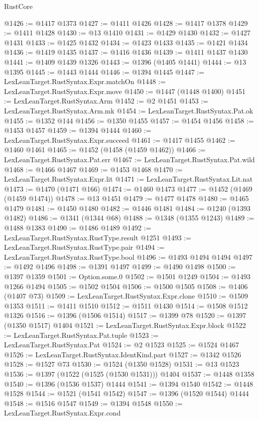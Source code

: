 \begin{lexlean}{RustCore}
\begin{coremodule}
{\begin{coremodule}
{{{{{{{{{{{{{{{{{{{{{{{{{{{{{{{{{{{{{{{{{{{{{@1426 := @1417 @1373
@1427 := @1411 @1426
@1428 := @1417 @1378
@1429 := @1411 @1428
@1430 := @13 @1410
@1431 := @1429 @1430
@1432 := @1427 @1431
@1433 := @1425 @1432
@1434 := @1423 @1433
@1435 := @1421 @1434
@1436 := @1419 @1435
@1437 := @1416 @1436
@1439 := @1411 @1437 @1430
@1441 := @1409 @1439 @1326
@1443 := @1396 (@1405 @1441)
@1444 := @13 @1395
@1445 := @1443 @1444
@1446 := @1394 @1445
@1447 := LexLeanTarget.RustSyntax.Expr.matchOn
@1448 := LexLeanTarget.RustSyntax.Expr.move
@1450 := @1447 (@1448 @1400)
@1451 := LexLeanTarget.RustSyntax.Arm
@1452 := @2 @1451
@1453 := LexLeanTarget.RustSyntax.Arm.mk
@1454 := LexLeanTarget.RustSyntax.Pat.ok
@1455 := @1352 @144
@1456 := @1350 @1455
@1457 := @1454 @1456
@1458 := @1453 @1457
@1459 := @1394 @1444
@1460 := LexLeanTarget.RustSyntax.Expr.succeed
@1461 := @1417 @1455
@1462 := @1460 @1461
@1465 := @1452 (@1458 (@1459 @1462))
@1466 := LexLeanTarget.RustSyntax.Pat.err
@1467 := LexLeanTarget.RustSyntax.Pat.wild
@1468 := @1466 @1467
@1469 := @1453 @1468
@1470 := LexLeanTarget.RustSyntax.Expr.lit
@1471 := LexLeanTarget.RustSyntax.Lit.nat
@1473 := @1470 (@1471 @166)
@1474 := @1460 @1473
@1477 := @1452 (@1469 (@1459 @1474))
@1478 := @13 @1451
@1479 := @1477 @1478
@1480 := @1465 @1479
@1481 := @1450 @1480
@1482 := @1446 @1481
@1484 := @1240 (@1393 @1482)
@1486 := @1341 (@1344 @68)
@1488 := @1348 (@1355 @1243)
@1489 := @1488 @1383
@1490 := @1486 @1489
@1492 := LexLeanTarget.RustSyntax.RustType.result @1251
@1493 := LexLeanTarget.RustSyntax.RustType.pair
@1494 := LexLeanTarget.RustSyntax.RustType.bool
@1496 := @1493 @1494 @1494
@1497 := @1492 @1496
@1498 := @1391 @1497
@1499 := @1490 @1498
@1500 := @1397 @1359
@1501 := Option.some.{0}
@1502 := @1501 @1249
@1504 := @1493 @1266 @1494
@1505 := @1502 @1504
@1506 := @1500 @1505
@1508 := @1406 (@1407 @73)
@1509 := LexLeanTarget.RustSyntax.Expr.clone
@1510 := @1509 @1353
@1511 := @1411 @1510
@1512 := @1511 @1430
@1514 := @1508 @1512 @1326
@1516 := @1396 (@1506 @1514)
@1517 := @1399 @78
@1520 := @1397 (@1350 @1517) @1404
@1521 := LexLeanTarget.RustSyntax.Expr.block
@1522 := LexLeanTarget.RustSyntax.Pat.tuple
@1523 := LexLeanTarget.RustSyntax.Pat
@1524 := @2 @1523
@1525 := @1524 @1467
@1526 := LexLeanTarget.RustSyntax.IdentKind.part
@1527 := @1342 @1526
@1528 := @1527 @73
@1530 := @1524 (@1350 @1528)
@1531 := @13 @1523
@1536 := @1397 (@1522 (@1525 (@1530 @1531))) @1404
@1537 := @1448 @1358
@1540 := @1396 (@1536 @1537) @1444
@1541 := @1394 @1540
@1542 := @1448 @1528
@1544 := @1521 (@1541 @1542)
@1547 := @1396 (@1520 @1544) @1444
@1548 := @1516 @1547
@1549 := @1394 @1548
@1550 := LexLeanTarget.RustSyntax.Expr.cond
}}}}}}}}}}}}}}}}}}}}}}}}}}}}}}}}}}}}}}}}}}}}}
\end{coremodule}}
\end{coremodule}
\end{lexlean}
